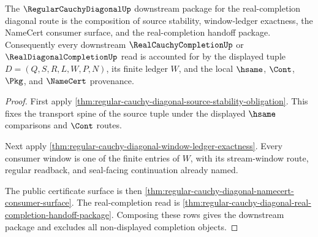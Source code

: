 \begin{theorem}
\label{thm:regular-cauchy-diagonal-downstream-unblock-package}
The $\RegularCauchyDiagonalUp$ downstream package for the real-completion diagonal route is the composition of source stability, window-ledger exactness, the NameCert consumer surface, and the real-completion handoff package. Consequently every downstream $\RealCauchyCompletionUp$ or $\RealDiagonalCompletionUp$ read is accounted for by the displayed tuple $D=(Q,S,R,L,W,P,N)$, its finite ledger $W$, and the local $\hsame$, $\Cont$, $\Pkg$, and $\NameCert$ provenance.
\end{theorem}
\begin{proof}
First apply \autoref{thm:regular-cauchy-diagonal-source-stability-obligation}. This fixes the transport spine of the source tuple under the displayed $\hsame$ comparisons and $\Cont$ routes.

Next apply \autoref{thm:regular-cauchy-diagonal-window-ledger-exactness}. Every consumer window is one of the finite entries of $W$, with its stream-window route, regular readback, and seal-facing continuation already named.

The public certificate surface is then \autoref{thm:regular-cauchy-diagonal-namecert-consumer-surface}. The real-completion read is \autoref{thm:regular-cauchy-diagonal-real-completion-handoff-package}. Composing these rows gives the downstream package and excludes all non-displayed completion objects.
\end{proof}

